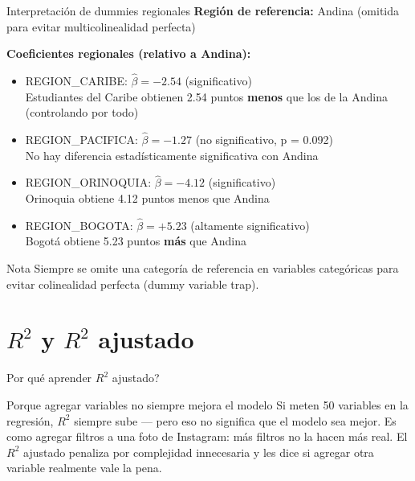 \documentclass[aspectratio=169, 11pt]{beamer}
\begin{document}
\begin{frame}{Interpretaci\'on de dummies regionales}
\textbf{Regi\'on de referencia:} Andina (omitida para evitar multicolinealidad perfecta)

\vspace{0.1cm}
\textbf{Coeficientes regionales (relativo a Andina):}
\begin{itemize}
  \item REGION\_CARIBE: $\hat{\beta} = -2.54$ (significativo)\\
    Estudiantes del Caribe obtienen 2.54 puntos \textbf{menos} que los de la Andina (controlando por todo)

  \item REGION\_PACIFICA: $\hat{\beta} = -1.27$ (no significativo, p = 0.092)\\
    No hay diferencia estadísticamente significativa con Andina

  \item REGION\_ORINOQUIA: $\hat{\beta} = -4.12$ (significativo)\\
    Orinoquia obtiene 4.12 puntos menos que Andina

  \item REGION\_BOGOTA: $\hat{\beta} = +5.23$ (altamente significativo)\\
    Bogotá obtiene 5.23 puntos \textbf{más} que Andina
\end{itemize}

\vspace{0.2cm}
\begin{alertblock}{Nota}
Siempre se omite una categoría de referencia en variables categóricas para evitar colinealidad perfecta (dummy variable trap).
\end{alertblock}
\end{frame}

\section{$R^2$ y $R^2$ ajustado}

\begin{frame}{\textquestiondown{}Por qu\'e aprender $R^2$ ajustado?}
\begin{exampleblock}{Porque agregar variables no siempre mejora el modelo}
\small
Si meten 50 variables en la regresi\'on, $R^2$ siempre sube --- pero eso no significa que el modelo sea mejor. Es como agregar filtros a una foto de Instagram: m\'as filtros no la hacen m\'as real. El $R^2$ ajustado penaliza por complejidad innecesaria y les dice si agregar otra variable realmente vale la pena.
\end{exampleblock}
\end{frame}
\end{document}
